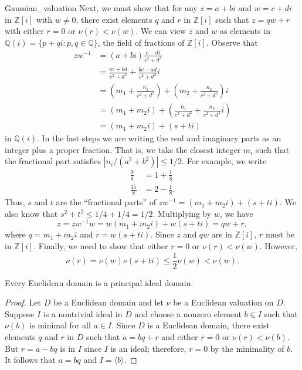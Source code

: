 \begin{example}{Gaussian_valuation}
Next, we must show that for any $z= a+bi$ and $w = c+di$ in ${\mathbb Z}[i]$ with $w \neq 0$, there exist elements $q$ and $r$ in 
${\mathbb Z}[i]$  such that $z = qw + r$ with either $r=0$ or  $\nu(r) < \nu(w)$.  We can view $z$ and $w$ as elements in ${\mathbb
Q}(i) = \{ p + qi : p, q \in {\mathbb Q} \}$, the field of fractions of ${\mathbb Z}[i]$.  Observe that
\begin{align*}
z w^{-1} & = (a +b i) \frac{c -d i}{c^2 + d^2} \\
& =
\frac{ac + b d}{c^2 + d^2} + \frac{b c -ad}{c^2 + d^2}i \\
& =
\left( 
m_1 + \frac{n_1}{c^2 + d^2}
\right)
+ 
\left(
m_2 + \frac{n_2}{c^2 + d^2}
\right) i \\
& =
(m_1 + m_2 i) + \left( 
\frac{n_1}{c^2 + d^2}
+ 
\frac{n_2}{c^2 + d^2}i
\right) \\
& =
(m_1 + m_2 i) + (s + ti)
\end{align*}
in ${\mathbb Q}(i)$.  In the last steps we are writing the real and imaginary parts as an integer plus a proper fraction.  That is, we take
the closest integer $m_i$ such that the fractional part satisfies $|n_i / (a^2 + b^2)| \leq 1/2$.  For example, we write 
\begin{align*}
\frac{9}{8} & = 1 + \frac{1}{8} \\
\frac{15}{8} & = 2 - \frac{1}{8}.
\end{align*}
Thus, $s$ and $t$ are the ``fractional parts'' of $z w^{-1} = (m_1 + m_2 i) + (s + ti)$. We also know that $s^2 + t^2 \leq 1/4 + 1/4 =
1/2$.  Multiplying by $w$, we have
\[
z = z w^{-1} w = w (m_1 + m_2 i) + w (s + ti)  = q w + r,
\]
where $q = m_1 + m_2 i$ and $r =  w (s + ti)$.  Since $z$ and $qw$ are in ${\mathbb Z}[i]$, $r$ must be in ${\mathbb Z}[i]$.  Finally, we need to show that either $r = 0$ or $\nu(r) < \nu(w)$.  However,
\[
\nu(r) = \nu(w) \nu(s + ti) \leq \frac{1}{2} \nu(w) < \nu(w).
\]
\end{example}

\begin{theorem}
Every Euclidean domain is a principal ideal domain.
\end{theorem}
 
\begin{proof}
Let $D$ be a Euclidean domain and let $\nu$ be a Euclidean valuation
on $D$.  Suppose $I$ is a nontrivial ideal in $D$ and choose a nonzero
element $b \in I$ such that $\nu(b)$ is minimal for all $a \in I$. 
Since $D$ is a Euclidean domain, there exist elements $q$ and $r$ in
$D$ such that $a = bq +r$ and either $r=0$ or $\nu(r) < \nu(b)$. But
$r = a - bq$ is in $I$ since $I$ is an ideal; therefore, $r = 0$ by the
minimality of $b$. It follows that $a = bq$ and $I = \langle b
\rangle$. 
\end{proof}
 

